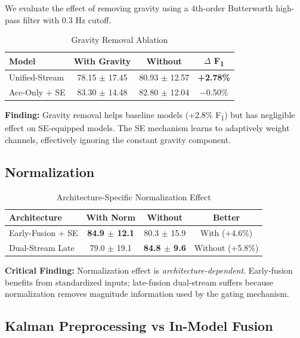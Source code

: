 \documentclass[journal,12pt]{IEEEtran}
\newcommand{\best}[1]{\textbf{\textcolor{bestresult}{#1}}}
\newcommand{\fone}{F\textsubscript{1}}
\begin{document}
We evaluate the effect of removing gravity using a 4th-order Butterworth high-pass filter with 0.3 Hz cutoff.

\begin{table}[htbp]
\centering
\caption{Gravity Removal Ablation}
\label{tab:gravity}
\begin{tabular}{@{}lccc@{}}
\toprule
\textbf{Model} & \textbf{With Gravity} & \textbf{Without} & $\Delta$ \textbf{\fone{}} \\
\midrule
Unified-Stream & 78.15 $\pm$ 17.45 & 80.93 $\pm$ 12.57 & \best{+2.78\%} \\
Acc-Only + SE & 83.30 $\pm$ 14.48 & 82.80 $\pm$ 12.04 & $-$0.50\% \\
\bottomrule
\end{tabular}
\end{table}

\textbf{Finding:} Gravity removal helps baseline models (+2.8\% \fone{}) but has negligible effect on SE-equipped models. The SE mechanism learns to adaptively weight channels, effectively ignoring the constant gravity component.

\subsection{Normalization}

\begin{table}[htbp]
\centering
\caption{Architecture-Specific Normalization Effect}
\label{tab:norm}
\begin{tabular}{@{}lccc@{}}
\toprule
\textbf{Architecture} & \textbf{With Norm} & \textbf{Without} & \textbf{Better} \\
\midrule
Early-Fusion + SE & \best{84.9 $\pm$ 12.1} & 80.3 $\pm$ 15.9 & With (+4.6\%) \\
Dual-Stream Late & 79.0 $\pm$ 19.1 & \best{84.8 $\pm$ 9.6} & Without (+5.8\%) \\
\bottomrule
\end{tabular}
\end{table}

\textbf{Critical Finding:} Normalization effect is \emph{architecture-dependent}. Early-fusion benefits from standardized inputs; late-fusion dual-stream suffers because normalization removes magnitude information used by the gating mechanism.

\subsection{Kalman Preprocessing vs In-Model Fusion}
\end{document}
